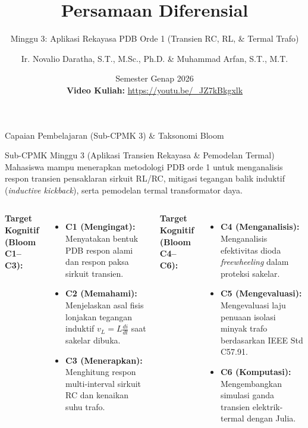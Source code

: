 \documentclass[aspectratio=169,10pt]{beamer}
\title[Persamaan Diferensial (Minggu 3)]{Persamaan Diferensial}
\subtitle{Minggu 3: Aplikasi Rekayasa PDB Orde 1 (Transien RC, RL, \& Termal Trafo)}
\author[Novalio \& Arfan (UNIB)]{Ir. Novalio Daratha, S.T., M.Sc., Ph.D. \& Muhammad Arfan, S.T., M.T.}
\institute[Teknik Elektro UNIB]{Program Studi S1 Teknik Elektro, Jurusan Teknik Elektro \& Informatika\\Fakultas Teknik, Universitas Bengkulu}
\date[2026]{Semester Genap 2026 \\[1.5mm] {\scriptsize\color{red!85!black}\textbf{Video Kuliah:}} {\scriptsize\url{https://youtu.be/_JZ7kBkgxlk}} \quad \textbar \quad {\scriptsize\href{https://www.youtube.com/playlist?list=PLS5oOZWXZeTw}{\color{unibblue}\textbf{Playlist YouTube}}}}
\begin{document}
\begin{frame}[plain]
  \titlepage
\end{frame}

\begin{frame}{Capaian Pembelajaran (Sub-CPMK 3) \& Taksonomi Bloom}
  \begin{block}{Sub-CPMK Minggu 3 (Aplikasi Transien Rekayasa \& Pemodelan Termal)}
    Mahasiswa mampu menerapkan metodologi PDB orde 1 untuk menganalisis respon transien pensaklaran sirkuit RL/RC, mitigasi tegangan balik induktif (\textit{inductive kickback}), serta pemodelan termal transformator daya.
  \end{block}
  \vspace{0.15cm}
  \begin{columns}[t]
    \textbf{Target Kognitif (Bloom C1--C3):}
    \begin{itemize}
      \item \textbf{C1 (Mengingat):} Menyatakan bentuk PDB respon alami dan respon paksa sirkuit transien.
      \item \textbf{C2 (Memahami):} Menjelaskan asal fisis lonjakan tegangan induktif $v_L = L \frac{di}{dt}$ saat sakelar dibuka.
      \item \textbf{C3 (Menerapkan):} Menghitung respon multi-interval sirkuit RC dan kenaikan suhu trafo.
    \end{itemize}

    \textbf{Target Kognitif (Bloom C4--C6):}
    \begin{itemize}
      \item \textbf{C4 (Menganalisis):} Menganalisis efektivitas dioda \textit{freewheeling} dalam proteksi sakelar.
      \item \textbf{C5 (Mengevaluasi):} Mengevaluasi laju penuaan isolasi minyak trafo berdasarkan IEEE Std C57.91.
      \item \textbf{C6 (Komputasi):} Mengembangkan simulasi ganda transien elektrik-termal dengan Julia.
    \end{itemize}
  \end{columns}
\end{frame}
\end{document}
